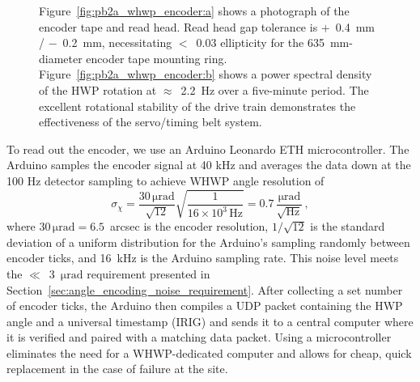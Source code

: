 \begin{figure}[!t]
    \centering
    \caption[The PB-2a WHWP encoder mechanism and performance.]{Figure~\ref{fig:pb2a_whwp_encoder:a} shows a photograph of the encoder tape and read head. Read head gap tolerance is $+$~0.4~mm / $−$~0.2~mm, necessitating $<$~0.03 ellipticity for the 635~mm-diameter encoder tape mounting ring. Figure~\ref{fig:pb2a_whwp_encoder:b} shows a power spectral density of the HWP rotation at $\approx$~2.2~Hz over a five-minute period. The excellent rotational stability of the drive train demonstrates the effectiveness of the servo/timing belt system.}
    \label{fig:pb2a_whwp_encoder}
\end{figure}

To read out the encoder, we use an Arduino Leonardo ETH microcontroller. The Arduino samples the encoder signal at 40 kHz and averages the data down at the 100 Hz detector sampling to achieve WHWP angle resolution of
\begin{equation}
    \sigma_{\chi} = \frac{30 \, \mathrm{\mu rad}}{\sqrt{12}} \sqrt{\frac{1}{16 \times 10^{3} \, \mathrm{Hz}}} = 0.7 \, \frac{\mathrm{\mu rad}}{\sqrt{\mathrm{Hz}}} \, , 
\end{equation}
where $30 \, \mathrm{\mu rad} = 6.5$~arcsec is the encoder resolution, $1 / \sqrt{12}$ is the standard deviation of a uniform distribution for the Arduino's sampling randomly between encoder ticks, and 16~kHz is the Arduino sampling rate. This noise level meets the $\ll$~3~$\mathrm{\mu rad}$ requirement presented in Section~\ref{sec:angle_encoding_noise_requirement}. After collecting a set number of encoder ticks, the Arduino then compiles a UDP packet containing the HWP angle and a universal timestamp (IRIG) and sends it to a central computer where it is verified and paired with a matching data packet. Using a microcontroller eliminates the need for a WHWP-dedicated computer and allows for cheap, quick replacement in the case of failure at the site.

